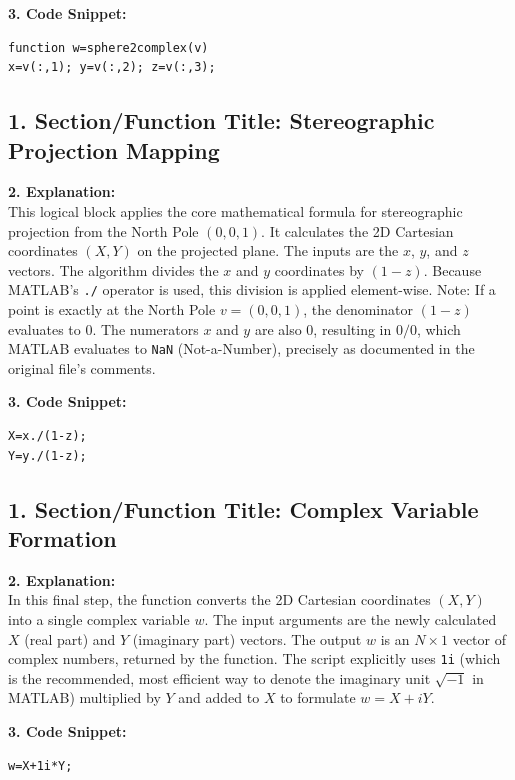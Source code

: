\textbf{3. Code Snippet:}
\begin{lstlisting}
function w=sphere2complex(v)
x=v(:,1); y=v(:,2); z=v(:,3);
\end{lstlisting}

\vspace{1em}

\subsection*{1. Section/Function Title: Stereographic Projection Mapping}
\textbf{2. Explanation:} \\
This logical block applies the core mathematical formula for stereographic projection from the North Pole $(0,0,1)$. It calculates the 2D Cartesian coordinates $(X, Y)$ on the projected plane. The inputs are the $x$, $y$, and $z$ vectors. The algorithm divides the $x$ and $y$ coordinates by $(1 - z)$. Because MATLAB's \texttt{./} operator is used, this division is applied element-wise. 
Note: If a point is exactly at the North Pole $v = (0, 0, 1)$, the denominator $(1 - z)$ evaluates to $0$. The numerators $x$ and $y$ are also $0$, resulting in $0/0$, which MATLAB evaluates to \texttt{NaN} (Not-a-Number), precisely as documented in the original file's comments.

\textbf{3. Code Snippet:}
\begin{lstlisting}
X=x./(1-z);
Y=y./(1-z);
\end{lstlisting}

\vspace{1em}

\subsection*{1. Section/Function Title: Complex Variable Formation}
\textbf{2. Explanation:} \\
In this final step, the function converts the 2D Cartesian coordinates $(X, Y)$ into a single complex variable $w$. The input arguments are the newly calculated $X$ (real part) and $Y$ (imaginary part) vectors. The output $w$ is an $N \times 1$ vector of complex numbers, returned by the function. The script explicitly uses \texttt{1i} (which is the recommended, most efficient way to denote the imaginary unit $\sqrt{-1}$ in MATLAB) multiplied by $Y$ and added to $X$ to formulate $w = X + iY$.

\textbf{3. Code Snippet:}
\begin{lstlisting}
w=X+1i*Y;
\end{lstlisting}

